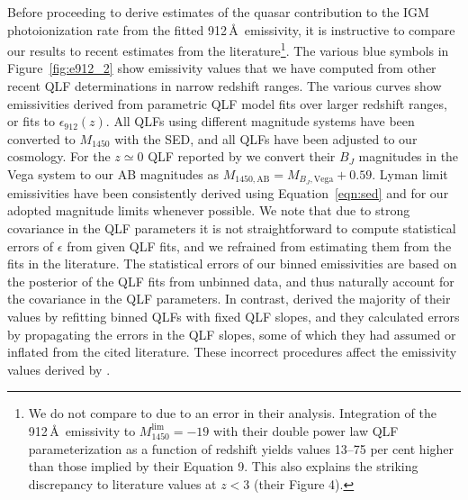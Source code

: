 \documentclass[fleqn,usenatbib]{mnras}
\begin{document}
Before proceeding to derive estimates of the quasar contribution to
the IGM  photoionization rate from the fitted
912\,\AA\ emissivity, it is instructive to compare our results to
recent estimates from the literature\footnote{We do not compare to
  \citet{2017MNRAS.466.1160M} due to an error in their analysis.
  Integration of the 912\,\AA\ emissivity to
  $M_{1450}^\mathrm{lim}=-19$ with their double power law QLF
  parameterization as a function of redshift yields values 13--75 per
  cent higher than those implied by their Equation 9.  This also
  explains the striking discrepancy to literature values at $z<3$
  (their Figure 4).}.  The various blue symbols in
Figure~\ref{fig:e912_2} show emissivity values that we have computed
from other recent QLF determinations in narrow redshift ranges.  The
various curves show emissivities derived from parametric QLF model
fits over larger redshift ranges, or fits to
$\epsilon_{912}\left(z\right)$. All QLFs using different magnitude
systems have been converted to $M_{1450}$ with the
\citet{2015MNRAS.449.4204L} SED, and all QLFs have been adjusted to
our cosmology.  For the $z\simeq 0$ QLF reported by
\citet{2009A&A...507..781S} we convert their $B_J$ magnitudes in the
Vega system to our AB magnitudes as $M_{1450,\mathrm{AB}}=M_{B_J,
  \mathrm{Vega}}+0.59$.  Lyman limit emissivities have been
consistently derived using Equation~\eqref{eqn:sed} and for our
adopted magnitude limits whenever possible.  We note that due to
strong covariance in the QLF parameters it is not straightforward to
compute statistical errors of $\epsilon$ from given QLF fits, and we
refrained from estimating them from the fits in the literature.  The
statistical errors of our binned emissivities are based on the
posterior of the QLF fits from unbinned data, and thus naturally
account for the covariance in the QLF parameters.  In contrast,
\citet{2015MNRAS.451L..30K} derived the majority of their values by
refitting binned QLFs with fixed QLF slopes, and they calculated
errors by propagating the errors in the QLF slopes, some of which they
had assumed or inflated from the cited literature.  These incorrect
procedures affect the emissivity values derived by
\citet{2015MNRAS.451L..30K}.
\end{document}

